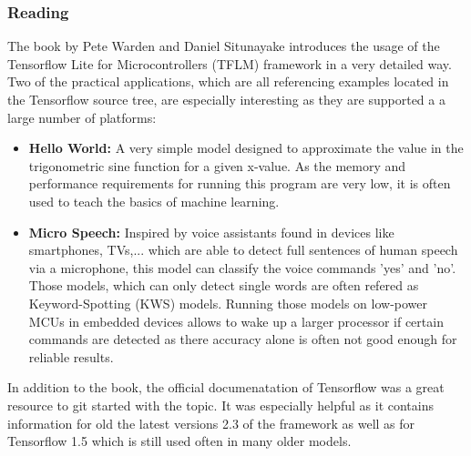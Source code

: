 \documentclass{tum-presentation}
\begin{document}
\begin{frame}
  \frametitle{Reading}

  The book by Pete Warden and Daniel Situnayake introduces the usage of the Tensorflow Lite for Microcontrollers (TFLM) framework in a very detailed way. Two of the practical applications, which are all referencing examples located in the Tensorflow source tree, are especially interesting as they are supported a a large number of platforms:

\begin{itemize}
    \item \textbf{Hello World:} A very simple model designed to approximate the value in the trigonometric sine function for a given x-value. As the memory and performance requirements for running this program are very low, it is often used to teach the basics of machine learning.
    \item \textbf{Micro Speech:} Inspired by voice assistants found in devices like smartphones, TVs,... which are able to detect full sentences of human speech via a microphone, this model can classify the voice commands 'yes' and 'no'. Those models, which can only detect single words are often refered as Keyword-Spotting (KWS) models. Running those models on low-power MCUs in embedded devices allows to wake up a larger processor if certain commands are detected as there accuracy alone is often not good enough for reliable results. 
\end{itemize}

In addition to the book, the official documenatation of Tensorflow was a great resource to git started with the topic. It was especially helpful as it contains information for old the latest versions 2.3 of the framework as well as for Tensorflow 1.5 which is still used often in many older models.

\end{frame}
\end{document}
